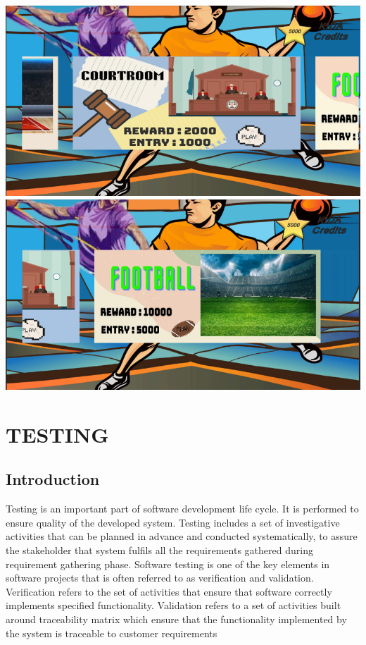 \documentclass[12pt]{report}
\begin{document}
\begin{center}
\includegraphics[scale=0.7]{image28.png}
\includegraphics[scale=0.7]{image29.png}
\end{center}



\vspace{1cm}

\clearpage
\centering
\section{TESTING}
\justifying
\setlength{\parindent}{4em}
\setlength{\parskip}{0.5em}
\renewcommand{\baselinestretch}{1.5}
\normalsize
\subsection{ Introduction}
\hspace{1.7 cm}Testing is an important part of software development life cycle. It is performed to ensure 
quality of the developed system. Testing includes a set of investigative activities that can be 
planned in advance and conducted systematically, to assure the stakeholder that system 
fulfils all the requirements gathered during requirement gathering phase. Software testing is 
one of the key elements in software projects that is often referred to as verification and 
validation. Verification refers to the set of activities that ensure that software correctly 
implements specified functionality. Validation refers to a set of activities built around 
traceability matrix which ensure that the functionality implemented by the system is 
traceable to customer requirements
\end{document}
